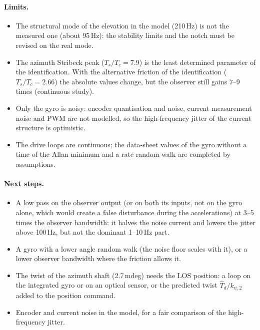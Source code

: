 \documentclass[10pt,a4paper]{article}
\numberwithin{equation}{section}
\begin{document}
\paragraph{Limits.}
\begin{itemize}
\item The structural mode of the elevation in the model (210\,Hz) is not the measured one (about 95\,Hz): the stability limits and the notch must be revised on the real mode.
\item The azimuth Stribeck peak ($T_s/T_c=7.9$) is the least determined parameter of the identification. With the alternative friction of the identification ($T_s/T_c=2.66$) the absolute values change, but the observer still gains 7--9 times (continuous study).
\item Only the gyro is noisy: encoder quantisation and noise, current measurement noise and PWM are not modelled, so the high-frequency jitter of the current structure is optimistic.
\item The drive loops are continuous; the data-sheet values of the gyro without a time of the Allan minimum and a rate random walk are completed by assumptions.
\end{itemize}
\paragraph{Next steps.}
\begin{itemize}
\item A low pass on the observer output (or on both its inputs, not on the gyro alone, which would create a false disturbance during the accelerations) at 3--5 times the observer bandwidth: it halves the noise current and lowers the jitter above 100\,Hz, but not the dominant 1--10\,Hz part.
\item A gyro with a lower angle random walk (the noise floor scales with it), or a lower observer bandwidth where the friction allows it.
\item The twist of the azimuth shaft (2.7\,mdeg) needs the LOS position: a loop on the integrated gyro or on an optical sensor, or the predicted twist $\hat T_d/k_{\psi,2}$ added to the position command.
\item Encoder and current noise in the model, for a fair comparison of the high-frequency jitter.
\end{itemize}
\end{document}
